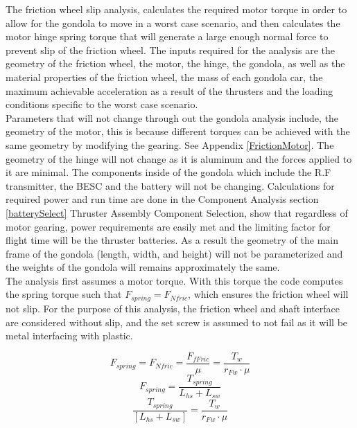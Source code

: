 \documentclass[../main.tex]{subfiles}
\begin{document}
The friction wheel slip analysis, calculates the required motor torque in order to allow for the gondola to move in a worst case scenario, and then calculates the motor hinge spring torque that will generate a large enough normal force to prevent slip of the friction wheel. The inputs required for the analysis are the geometry of the friction wheel, the motor, the hinge, the gondola, as well as the material properties of the friction wheel, the mass of each gondola car, the maximum achievable acceleration as a result of the thrusters and the loading conditions specific to the worst case scenario. \\

Parameters that will not change through out the gondola analysis include, the geometry of the motor, this is because different torques can be achieved with the same geometry by modifying the gearing. See Appendix \ref{FrictionMotor}. The geometry of the hinge will not change as it is aluminum and the forces applied to it are minimal. The components inside of the gondola which include the R.F transmitter, the BESC and the battery will not be changing. Calculations for required power and run time are done in the Component Analysis section \ref{batterySelect} Thruster Assembly Component Selection, show that regardless of motor gearing, power requirements are easily met and the limiting factor for flight time will be the thruster batteries. As a result the geometry of the main frame of the gondola (length, width, and height) will not be parameterized and the weights of the gondola will remains approximately the same. \\

The analysis first assumes a motor torque. With this torque the code computes the spring torque such that $F_{spring} = F_{Nfric}$, which ensures the friction wheel will not slip. For the purpose of this analysis, the friction wheel and shaft interface are considered without slip, and the set screw is assumed to not fail as it will be metal interfacing with plastic.

\begin{equation}
F_{spring} = F_{Nfric} = \frac{F_{fFric}}{\mu} = \frac{T_w}{r_{Fw}\cdot{}\mu}
\end{equation}
\begin{equation}
\label{eqn:springForce}
F_{spring} = \frac{T_{spring}}{L_{hs}+L_{sw}}
\end{equation}
\begin{equation}
\frac{T_{spring}}{[L_{hs}+L_{sw}]} = \frac{T_w}{r_{Fw}\cdot{}\mu}
\end{equation}
\end{document}
